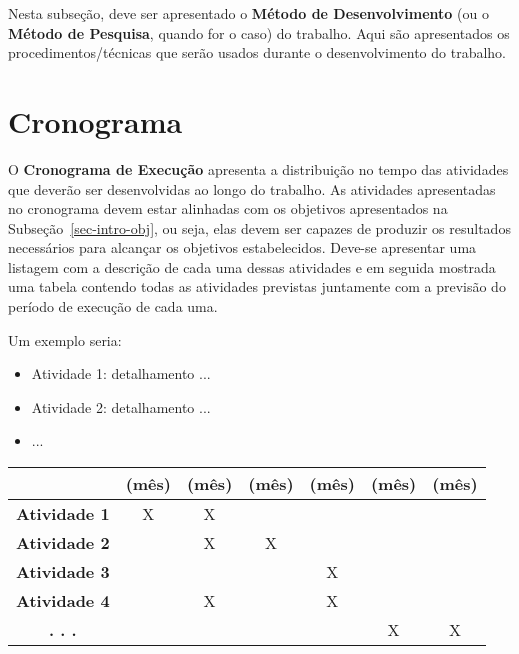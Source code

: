 Nesta subseção, deve ser apresentado o \textbf{Método de Desenvolvimento} (ou o \textbf{Método de Pesquisa}, quando for o caso) do trabalho. Aqui são apresentados os procedimentos/técnicas que serão usados durante o desenvolvimento do trabalho. 

\section{Cronograma}
\label{sec-intro-crono}

O \textbf{Cronograma de Execução} apresenta a distribuição no tempo das atividades
que deverão ser desenvolvidas ao longo do trabalho. As atividades apresentadas no cronograma devem estar alinhadas com os objetivos apresentados na Subseção~\ref{sec-intro-obj}, ou seja, elas devem ser capazes de produzir os resultados necessários para alcançar os objetivos estabelecidos. Deve-se apresentar uma listagem com a descrição de cada uma dessas atividades e em seguida mostrada uma tabela contendo todas as atividades previstas juntamente com a  previsão do período de execução de cada uma.

Um exemplo seria:
\begin{itemize}
\item Atividade 1: detalhamento ...
\item Atividade 2: detalhamento ...
\item ...
\end{itemize}

\begin{table}[h]
\centering
\begin{tabular}{c|c|c|c|c|c|c|}
\cline{2-7}
\multicolumn{1}{l|}{} & \textbf{(mês)} & \textbf{(mês)} & \textbf{(mês)} & \textbf{(mês)} & \textbf{(mês)} & \textbf{(mês)} \\ \hline
\multicolumn{1}{|c|}{\textbf{Atividade 1}} & X & X &  &  &  &  \\ \hline
\multicolumn{1}{|c|}{\textbf{Atividade 2}} &  & X & X &  &  &  \\ \hline
\multicolumn{1}{|c|}{\textbf{Atividade 3}} &  &  &  & X &  &  \\ \hline
\multicolumn{1}{|c|}{\textbf{Atividade 4}} &  & X &  & X &  &  \\ \hline
\multicolumn{1}{|c|}{\textbf{. . .}} &  &  &  &  & X & X \\ \hline
\end{tabular}
\end{table}